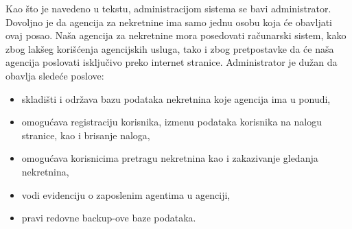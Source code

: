 \documentclass[20pt]{article}
\begin{document}
\indent Kao \v {s}to je navedeno u tekstu, administracijom sistema se bavi administrator. Dovoljno je da agencija za nekretnine ima samo jednu osobu koja \' ce obavljati ovaj posao. Na\v {s}a agencija za nekretnine mora posedovati ra\v {c}unarski sistem, kako zbog lak\v {s}eg kori\v {s}\' cenja agencijskih usluga, tako i zbog pretpostavke da \'ce na\v {s}a agencija poslovati isklju\v {c}ivo preko internet stranice. Administrator je du\v {z}an da obavlja slede\' ce poslove:
\begin{itemize}
    \item skladi\v {s}ti i odr\v {z}ava bazu podataka nekretnina koje agencija ima u ponudi,
    \item omogu\' cava registraciju korisnika, izmenu podataka korisnika na nalogu stranice, kao i brisanje naloga,
    \item omogu\' cava korisnicima pretragu nekretnina kao i zakazivanje gledanja nekretnina,
    \item vodi evidenciju o zaposlenim agentima u agenciji,
    \item pravi redovne backup-ove baze podataka.
\end{itemize}

\newpage
\end{document}
